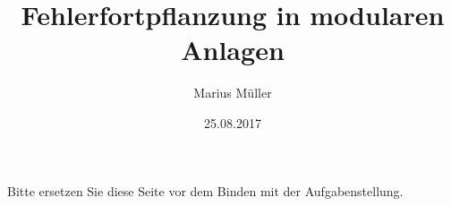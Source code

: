 \subject{Diplomarbeit}




\author{Marius M\"uller}
\title{Fehlerfortpflanzung in modularen Anlagen}
\date{25.08.2017}
\maketitlePLT



\newpage
\thispagestyle{empty}
\null\vfill
\begin{center}
	Bitte ersetzen Sie diese Seite vor dem Binden mit der Aufgabenstellung.
\end{center}
\vfill

